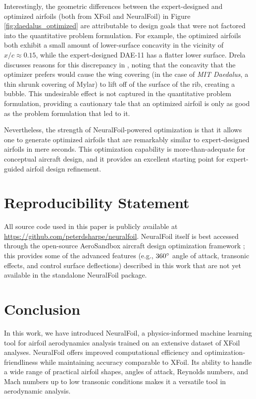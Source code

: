 \documentclass[conf]{new-aiaa}
\begin{document}
    Interestingly, the geometric differences between the expert-designed and optimized airfoils (both from XFoil and NeuralFoil) in Figure \ref{fig:daedalus_optimized} are attributable to design goals that were not factored into the quantitative problem formulation. For example, the optimized airfoils both exhibit a small amount of lower-surface concavity in the vicinity of $x/c \approx 0.15$, while the expert-designed DAE-11 has a flatter lower surface. Drela discusses reasons for this discrepancy in \cite{drela_pros_1998}, noting that the concavity that the optimizer prefers would cause the wing covering (in the case of \emph{MIT Daedalus}, a thin shrunk covering of Mylar) to lift off of the surface of the rib, creating a bubble. This undesirable effect is not captured in the quantitative problem formulation, providing a cautionary tale that an optimized airfoil is only as good as the problem formulation that led to it.

    Nevertheless, the strength of NeuralFoil-powered optimization is that it allows one to generate optimized airfoils that are remarkably similar to expert-designed airfoils in mere seconds. This optimization capability is more-than-adequate for conceptual aircraft design, and it provides an excellent starting point for expert-guided airfoil design refinement.


    \section{Reproducibility Statement}

    All source code used in this paper is publicly available at \url{https://github.com/peterdsharpe/neuralfoil}. NeuralFoil itself is best accessed through the open-source AeroSandbox aircraft design optimization framework \cite{sharpe_aerosandbox_2021}; this provides some of the advanced features (e.g., $360\degree$ angle of attack, transonic effects, and control surface deflections) described in this work that are not yet available in the standalone NeuralFoil package.


    \section{Conclusion}
    \label{sec:conclusion}

    In this work, we have introduced NeuralFoil, a physics-informed machine learning tool for airfoil aerodynamics analysis trained on an extensive dataset of XFoil analyses. NeuralFoil offers improved computational efficiency and optimization-friendliness while maintaining accuracy comparable to XFoil. Its ability to handle a wide range of practical airfoil shapes, angles of attack, Reynolds numbers, and Mach numbers up to low transonic conditions makes it a versatile tool in aerodynamic analysis.
\end{document}
